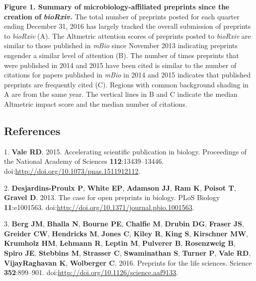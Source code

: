 \documentclass[11pt,]{article}
\begin{document}
\newpage

\textbf{Figure 1. Summary of microbiology-affiliated preprints since the
creation of} \textbf{\emph{bioRxiv.}} The total number of preprints
posted for each quarter ending December 31, 2016 has largely tracked the
overall submission of preprints to \emph{bioRxiv} (A). The Altmetric
attention scores of preprints posted to \emph{bioRxiv} are similar to
those published in \emph{mBio} since November 2013 indicating preprints
engender a similar level of attention (B). The number of times preprints
that were published in 2014 and 2015 have been cited is similar to the
number of citations for papers published in \emph{mBio} in 2014 and 2015
indicates that published preprints are frequently cited (C). Regions
with common background shading in A are from the same year. The vertical
lines in B and C indicate the median Altmetric impact score and the
median number of citations.

\newpage

\subsection*{References}\label{references}

1. \textbf{Vale RD}. 2015. Accelerating scientific publication in
biology. Proceedings of the National Academy of Sciences
\textbf{112}:13439--13446.
doi:\url{http://doi.org/10.1073/pnas.1511912112}.

2. \textbf{Desjardins-Proulx P}, \textbf{White EP}, \textbf{Adamson JJ},
\textbf{Ram K}, \textbf{Poisot T}, \textbf{Gravel D}. 2013. The case for
open preprints in biology. PLoS Biology \textbf{11}:e1001563.
doi:\url{http://doi.org/10.1371/journal.pbio.1001563}.

3. \textbf{Berg JM}, \textbf{Bhalla N}, \textbf{Bourne PE},
\textbf{Chalfie M}, \textbf{Drubin DG}, \textbf{Fraser JS},
\textbf{Greider CW}, \textbf{Hendricks M}, \textbf{Jones C},
\textbf{Kiley R}, \textbf{King S}, \textbf{Kirschner MW},
\textbf{Krumholz HM}, \textbf{Lehmann R}, \textbf{Leptin M},
\textbf{Pulverer B}, \textbf{Rosenzweig B}, \textbf{Spiro JE},
\textbf{Stebbins M}, \textbf{Strasser C}, \textbf{Swaminathan S},
\textbf{Turner P}, \textbf{Vale RD}, \textbf{VijayRaghavan K},
\textbf{Wolberger C}. 2016. Preprints for the life sciences. Science
\textbf{352}:899--901. doi:\url{http://doi.org/10.1126/science.aaf9133}.
\end{document}
